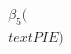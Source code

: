\documentclass[preview]{standalone}
\begin{document}
\begin{align*}
\beta_5(\\text{PIE})
\end{align*}
\end{document}
